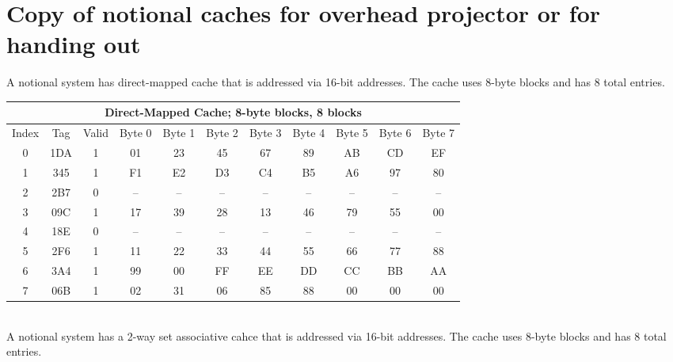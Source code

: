 \documentclass{article}
\begin{document}
\newpage

\section*{Copy of notional caches for overhead projector or for handing out}

A notional system has direct-mapped cache that is addressed via 16-bit addresses. The cache uses 8-byte blocks and has 8 total entries.

\begin{tabular}{||c|c|c||c|c|c|c|c|c|c|c||} \hline\hline
\multicolumn{11}{||c||}{Direct-Mapped Cache; 8-byte blocks, 8 blocks} \\ \hline
Index & Tag & Valid & Byte 0 & Byte 1 & Byte 2 & Byte 3 & Byte 4 & Byte 5 & Byte 6 & Byte 7 \\ \hline\hline
0 & 1DA & 1 & 01 & 23 & 45 & 67 & 89 & AB & CD & EF \\ \hline
1 & 345 & 1 & F1 & E2 & D3 & C4 & B5 & A6 & 97 & 80 \\ \hline
2 & 2B7 & 0 & -- & -- & -- & -- & -- & -- & -- & -- \\ \hline
3 & 09C & 1 & 17 & 39 & 28 & 13 & 46 & 79 & 55 & 00 \\ \hline
4 & 18E & 0 & -- & -- & -- & -- & -- & -- & -- & -- \\ \hline
5 & 2F6 & 1 & 11 & 22 & 33 & 44 & 55 & 66 & 77 & 88 \\ \hline
6 & 3A4 & 1 & 99 & 00 & FF & EE & DD & CC & BB & AA \\ \hline
7 & 06B & 1 & 02 & 31 & 06 & 85 & 88 & 00 & 00 & 00 \\ \hline\hline
\end{tabular}

\vspace{0.5cm}

\phantom{x} \\
A notional system has a 2-way set associative cahce that is addressed via 16-bit addresses. The cache uses 8-byte blocks and has 8 total entries.
\end{document}

